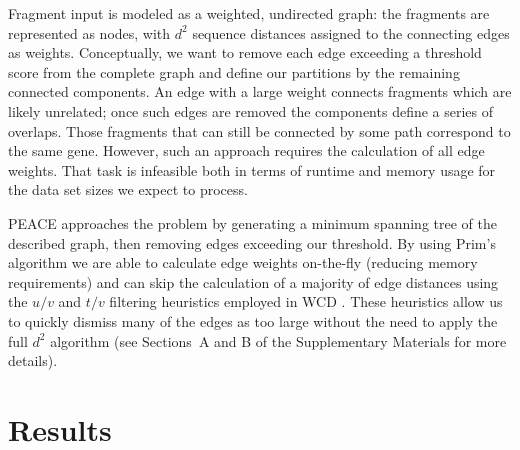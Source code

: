\documentclass[a4,center,fleqn]{NAR}
\newcommand{\peace} {{\small PEACE}}
\newcommand{\wcd} {{\small WCD}}
\begin{document}
Fragment input is modeled as a weighted, undirected graph: the
fragments are represented as nodes, with $d^2$ sequence distances
assigned to the connecting edges as weights.  Conceptually, we want to
remove each edge exceeding a threshold score from the complete graph
and define our partitions by the remaining connected components.  An
edge with a large weight connects fragments which are likely
unrelated; once such edges are removed the components define a series
of overlaps.  Those fragments that can still be connected by some path
correspond to the same gene.  However, such an approach requires the
calculation of all edge weights.  That task is infeasible both in terms
of runtime and memory usage for the data set sizes we expect to process.

\peace\/ approaches the problem by generating a minimum spanning tree of the
described graph, then removing edges exceeding our threshold.  By
using Prim's algorithm we are able to calculate edge weights
on-the-fly (reducing memory requirements) and can skip the
calculation of a majority of edge distances using the $u/v$ and $t/v$
filtering heuristics employed in \wcd\/ \cite{Hazelhurst08a}.
These heuristics allow us to quickly dismiss many of the edges as too
large without the need to apply the full $d^2$ algorithm (see
Sections~A and B of the Supplementary Materials for more details). 

\section{Results}
\end{document}
